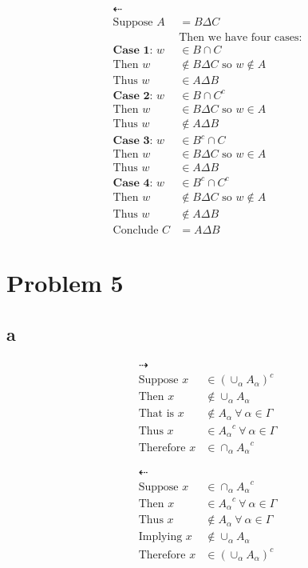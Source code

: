 \documentclass{article}
\begin{document}
\begin{flushleft}
\begin{align*}
\dashleftarrow\\
\text{Suppose } A&=B\Delta C\\
&\text{Then we have four cases:}\\
\textbf{Case 1: } w&\in B \cap C\\
\text{Then } w&\notin B \Delta C \text{ so } w\notin A\\
\text{Thus } w&\in A\Delta B\\
\textbf{Case 2: } w&\in B \cap C^c\\
\text{Then } w&\in B \Delta C \text{ so } w\in A\\
\text{Thus } w&\notin A\Delta B\\
\textbf{Case 3: } w&\in B^c \cap C\\
\text{Then } w&\in B \Delta C \text{ so } w\in A\\
\text{Thus } w&\in A\Delta B\\
\textbf{Case 4: } w&\in B^c \cap C^c\\
\text{Then } w&\notin B \Delta C \text{ so } w\notin A\\
\text{Thus } w&\notin A\Delta B\\
\text{Conclude } C&=A\Delta B
\end{align*}

\section*{Problem 5}
\subsection*{a}
\begin{align*}
\dashrightarrow\\
\text{Suppose } x &\in (\cup_\alpha A_\alpha)^c\\
\text{Then } x &\notin \cup_\alpha A_\alpha\\
\text{That is } x &\notin A_\alpha \ \forall \ \alpha \in \Gamma\\
\text{Thus } x &\in {A_\alpha}^c \ \forall \ \alpha \in \Gamma\\
\text{Therefore } x &\in \cap_\alpha {A_\alpha}^c
\end{align*}

\begin{align*}
\dashleftarrow\\
\text{Suppose } x &\in \cap_\alpha {A_\alpha}^c\\
\text{Then } x &\in {A_\alpha}^c \ \forall \ \alpha \in \Gamma\\
\text{Thus } x &\notin A_\alpha \ \forall \ \alpha \in \Gamma\\
\text{Implying } x &\notin \cup_\alpha A_\alpha\\
\text{Therefore } x &\in (\cup_\alpha {A_\alpha})^c
\end{align*}


\end{flushleft}
\end{document}
